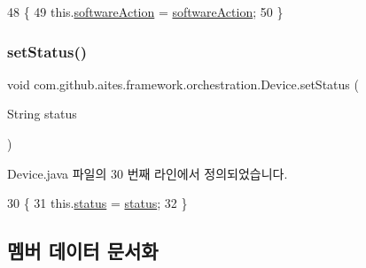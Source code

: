\begin{DoxyCode}
48                                                         \{
49         this.\mbox{\hyperlink{classcom_1_1github_1_1aites_1_1framework_1_1orchestration_1_1_device_a0e90e3fc258c236228d8789722bdf3bb}{softwareAction}} = \mbox{\hyperlink{classcom_1_1github_1_1aites_1_1framework_1_1orchestration_1_1_device_a0e90e3fc258c236228d8789722bdf3bb}{softwareAction}};
50     \}
\end{DoxyCode}
\mbox{\label{classcom_1_1github_1_1aites_1_1framework_1_1orchestration_1_1_device_a6061527628b8f54975f001b4a72de88f}} 
\subsubsection{\texorpdfstring{set\+Status()}{setStatus()}}
{\footnotesize\ttfamily void com.\+github.\+aites.\+framework.\+orchestration.\+Device.\+set\+Status (\begin{DoxyParamCaption}\item[{String}]{status }\end{DoxyParamCaption})}



Device.\+java 파일의 30 번째 라인에서 정의되었습니다.


\begin{DoxyCode}
30                                         \{
31         this.\mbox{\hyperlink{classcom_1_1github_1_1aites_1_1framework_1_1orchestration_1_1_device_abe5c31f96d08c3caf2085af43d59cf6f}{status}} = \mbox{\hyperlink{classcom_1_1github_1_1aites_1_1framework_1_1orchestration_1_1_device_abe5c31f96d08c3caf2085af43d59cf6f}{status}};
32     \}
\end{DoxyCode}


\subsection{멤버 데이터 문서화}
\mbox{\label{classcom_1_1github_1_1aites_1_1framework_1_1orchestration_1_1_device_a81329ac5d638ae2e569595efd92a4fe4}} 
